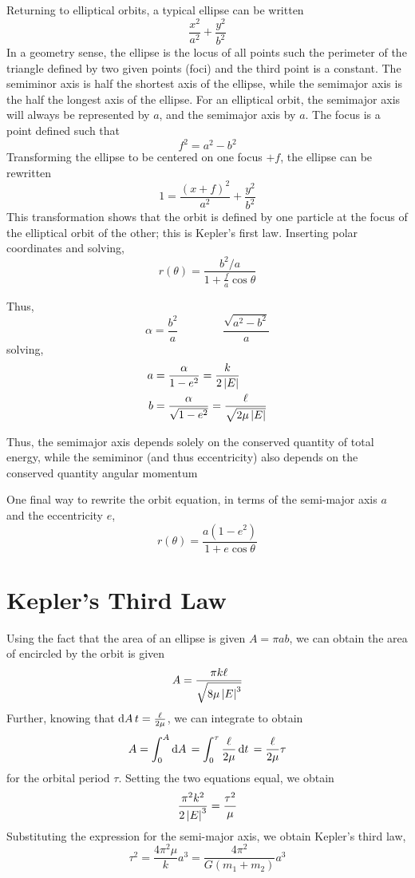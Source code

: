Returning to elliptical orbits, a typical ellipse can be written
\[\frac{x^2}{a^2} + \frac{y^2}{b^2}\]
In a geometry sense, the ellipse is the locus of all points such the perimeter of the triangle defined by two given points (foci) and the third point is a constant. The semiminor axis is half the shortest axis of the ellipse, while the semimajor axis is the half the longest axis of the ellipse. For an elliptical orbit, the semimajor axis will always be represented by \(a\), and the semimajor axis by \(a\). The focus is a point defined such that
\[f^2=a^2-b^2\]
Transforming the ellipse to be centered on one focus \(+f\), the ellipse can be rewritten
\[1 = \frac{(x+f)^2}{a^2}+\frac{y^2}{b^2}\]
This transformation shows that the orbit is defined by one particle at the focus of the elliptical orbit of the other; this is Kepler's first law. Inserting polar coordinates and solving,
\begin{equation}
	r(\theta) = \frac{b^2/a}{1+\frac{f}{a}\cos\theta}
\end{equation}

Thus,
\[\alpha = \frac{b^2}{a} \qquad\qquad \frac{\sqrt{a^2-b^2}}{a}\]
solving,
\begin{subequations}
	\begin{align*}
		a&=\frac{\alpha}{1-e^2} = \frac{k}{2\left|E\right|}\\
		b&=\frac{\alpha}{\sqrt{1-e^2}} = \frac{\ell}{\sqrt{2\mu\left|E\right|}}
\end{align*}
\end{subequations}

Thus, the semimajor axis depends solely on the conserved quantity of total energy, while the semiminor (and thus eccentricity) also depends on the conserved quantity angular momentum

One final way to rewrite the orbit equation, in terms of the semi-major axis \(a\) and the eccentricity \(e\), 
\begin{equation}
	r(\theta) = \frac{a(1-e^2)}{1+e\cos\theta}
\end{equation}

\section{Kepler's Third Law}
Using the fact that the area of an ellipse is given \(A=\pi ab\), we can obtain the area of encircled by the orbit is given
\[A=\frac{\pi k\ell}{\sqrt{8\mu \left|E\right|^3}}\]
Further, knowing that \(\d{A}{t}=\frac{\ell}{2\mu}\), we can integrate to obtain 
\[A=\int_0^A\d{A}=\int_0^\tau\frac{\ell}{2\mu}\d{t}=\frac{\ell}{2\mu}\tau\]
for the orbital period \(\tau\). Setting the two equations equal, we obtain
\[\frac{\pi^2k^2}{2\left|E\right|^3}=\frac{\tau^2}{\mu}\]
Substituting the expression for the semi-major axis, we obtain Kepler's third law,
\begin{equation}
	\tau^2 = \frac{4\pi^2\mu}{k}a^3=\frac{4\pi^2}{G(m_1+m_2)}a^3
\end{equation}

